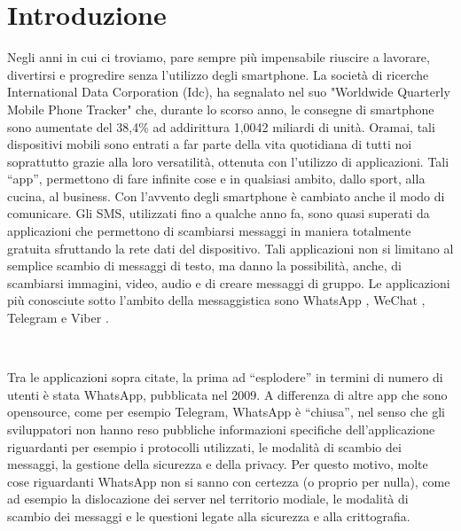 \documentclass[a4paper,11pt]{book}
\begin{document}
\begin{frontespizio}
\end{frontespizio}


\tableofcontents

\chapter{Introduzione}
Negli anni in cui ci troviamo, pare sempre pi\`u impensabile riuscire a lavorare, divertirsi e progredire senza l'utilizzo degli smartphone. La società di ricerche International Data Corporation (Idc), ha segnalato nel suo "Worldwide Quarterly Mobile Phone Tracker" che, durante lo scorso anno, le consegne di smartphone sono aumentate del 38,4\% ad addirittura 1,0042 miliardi di unità.
Oramai, tali dispositivi mobili sono entrati a far parte della vita quotidiana di tutti noi soprattutto grazie alla loro versatilit\`a, ottenuta con l'utilizzo di applicazioni.
Tali ``app'', permettono di fare infinite cose e in qualsiasi ambito, dallo sport, alla cucina, al business. Con l'avvento degli smartphone \`e cambiato anche il modo di comunicare.
Gli SMS, utilizzati fino a qualche anno fa, sono quasi superati da applicazioni che permettono di scambiarsi messaggi in maniera totalmente gratuita sfruttando la rete dati del dispositivo. Tali applicazioni non si limitano al semplice scambio di messaggi di testo, ma danno la possibilit\`a, anche, di scambiarsi immagini, video, audio e di creare messaggi di gruppo.
Le applicazioni pi\`u conosciute sotto l'ambito della messaggistica sono WhatsApp \cite{rif1}, WeChat \cite{rif2}, Telegram \cite{rif3} e Viber \cite{rif4}.

~

Tra le applicazioni sopra citate, la prima ad ``esplodere'' in termini di numero di utenti \`e stata WhatsApp, pubblicata nel 2009. A differenza di altre app che sono opensource, come per esempio Telegram, WhatsApp \`e ``chiusa'', nel senso che gli sviluppatori non hanno reso pubbliche informazioni specifiche dell'applicazione riguardanti per esempio i protocolli utilizzati, le modalit\`a di scambio dei messaggi, la gestione della sicurezza e della privacy.
Per questo motivo, molte cose riguardanti WhatsApp non si sanno con certezza (o proprio per nulla), come ad esempio la dislocazione dei server nel territorio modiale, le modalit\`a di scambio dei messaggi e le questioni legate alla sicurezza e alla crittografia.
\end{document}
